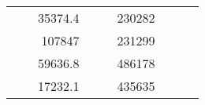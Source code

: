 \begin{table}[H]
\begin{tabular}{|ccrccrccc}
\multicolumn{1}{|c|}{\cellcolor[HTML]{FFFFC7}}                                & \multicolumn{1}{c|}{\cellcolor[HTML]{DAE8FC}}                      & \multicolumn{1}{r|}{\cellcolor[HTML]{DAE8FC}35374.4}   & \multicolumn{1}{c|}{\cellcolor[HTML]{FFFFC7}}                                & \multicolumn{1}{c|}{\cellcolor[HTML]{DAE8FC}}                       & \multicolumn{1}{r|}{\cellcolor[HTML]{DDFDFF}230282}    &                                                                              &                                                                    &                                                        \\ \cline{3-3} \cline{6-6}
\multicolumn{1}{|c|}{\cellcolor[HTML]{FFFFC7}}                                & \multicolumn{1}{c|}{\cellcolor[HTML]{DAE8FC}}                      & \multicolumn{1}{r|}{\cellcolor[HTML]{DDFDFF}107847}    & \multicolumn{1}{c|}{\cellcolor[HTML]{FFFFC7}}                                & \multicolumn{1}{c|}{\cellcolor[HTML]{DAE8FC}}                       & \multicolumn{1}{r|}{\cellcolor[HTML]{DAE8FC}231299}    &                                                                              &                                                                    &                                                        \\ \cline{3-3} \cline{6-6}
\multicolumn{1}{|c|}{\cellcolor[HTML]{FFFFC7}}                                & \multicolumn{1}{c|}{\cellcolor[HTML]{DAE8FC}}                      & \multicolumn{1}{r|}{\cellcolor[HTML]{DAE8FC}59636.8}   & \multicolumn{1}{c|}{\cellcolor[HTML]{FFFFC7}}                                & \multicolumn{1}{c|}{\cellcolor[HTML]{DAE8FC}}                       & \multicolumn{1}{r|}{\cellcolor[HTML]{DDFDFF}486178}    &                                                                              &                                                                    &                                                        \\ \cline{3-3} \cline{6-6}
\multicolumn{1}{|c|}{\cellcolor[HTML]{FFFFC7}}                                & \multicolumn{1}{c|}{\cellcolor[HTML]{DAE8FC}}                      & \multicolumn{1}{r|}{\cellcolor[HTML]{DDFDFF}17232.1}   & \multicolumn{1}{c|}{\cellcolor[HTML]{FFFFC7}}                                & \multicolumn{1}{c|}{\cellcolor[HTML]{DAE8FC}}                       & \multicolumn{1}{r|}{\cellcolor[HTML]{DAE8FC}435635}    &                                                                              &                                                                    &                                                        \\ \cline{3-3} \cline{6-6}

\end{tabular}
\end{table}
